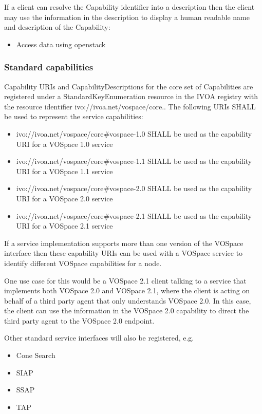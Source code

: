 \documentclass[11pt,a4paper]{ivoa}
\begin{document}
If a client can resolve the Capability identifier into a description then the client may use the information in the description to display a human readable name and description of the Capability:

\begin{itemize}
    \item Access data using openstack
\end{itemize}

\subsubsection{Standard capabilities}
\label{subsubsec:standard capabilities}
Capability URIs and CapabilityDescriptions for the core set of Capabilities are registered under a StandardKeyEnumeration resource \citep{std:STDREGEXT} in the IVOA registry with the resource identifier ivo://ivoa.net/vospace/core.. The following URIs SHALL be used to represent the service capabilities:

\begin{itemize}
    \item ivo://ivoa.net/vospace/core\#vospace-1.0 SHALL be used as the capability URI for a VOSpace 1.0 service
    \item ivo://ivoa.net/vospace/core\#vospace-1.1 SHALL be used as the capability URI for a VOSpace 1.1 service
    \item ivo://ivoa.net/vospace/core\#vospace-2.0 SHALL be used as the capability URI for a VOSpace 2.0 service
    \item ivo://ivoa.net/vospace/core\#vospace-2.1 SHALL be used as the capability URI for a VOSpace 2.1 service
\end{itemize}
If a service implementation supports more than one version of the VOSpace interface then these capability URIs can be used with a VOSpace service to identify different VOSpace capabilities for a node.

One use case for this would be a VOSpace 2.1 client talking to a service that implements both VOSpace 2.0 and VOSpace 2.1, where the client is acting on behalf of a third party agent that only understands VOSpace 2.0. In this case, the client can use the information in the VOSpace 2.0 capability to direct the third party agent to the VOSpace 2.0 endpoint.

Other standard service interfaces will also be registered, e.g.

\begin{itemize}
    \item Cone Search
    \item SIAP
    \item SSAP
    \item TAP
\end{itemize}
\end{document}
